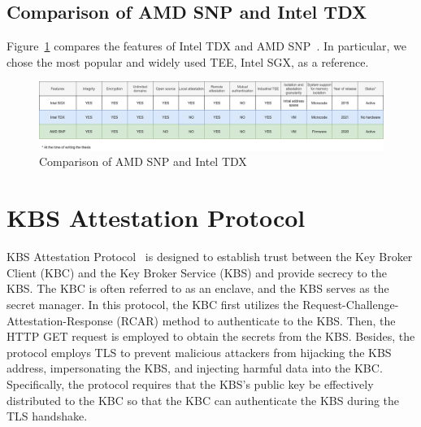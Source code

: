 \subsection{Comparison of AMD SNP and Intel TDX}
Figure~\ref{fig:snp_tdx_compare} compares the features of Intel TDX and AMD SNP~\cite*{amd_sev_summarize}. In particular, we chose the most popular and widely used TEE, Intel SGX, 
as a reference.

\begin{figure}[htp]
  \centering
  \includegraphics[width=1\textwidth]{images/snp_tdx_compare.png}
  \caption[Comparison of AMD SNP and Intel TDX]{Comparison of AMD SNP and Intel TDX}
  \label{fig:snp_tdx_compare}
\end{figure}




\section{KBS Attestation Protocol}

KBS Attestation Protocol~\cite*{kbs_Attestation_protocol} is designed to establish trust between the Key Broker Client (KBC) and the Key Broker Service (KBS) and provide secrecy to the KBS.  The KBC is often referred to as an enclave, and the KBS serves as the secret manager. In this protocol, the KBC first utilizes the 
Request-Challenge-Attestation-Response (RCAR) method to authenticate to the KBS. Then, the HTTP GET request is employed to obtain the secrets from the KBS. Besides, the protocol employs TLS to prevent malicious attackers from hijacking the KBS address,  impersonating the KBS,  and injecting harmful 
data into the KBC. Specifically, the protocol requires that the KBS's public key be effectively distributed to the KBC so that the KBC can authenticate the KBS during the TLS handshake.

